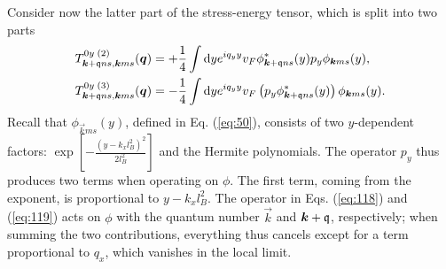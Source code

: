 Consider now the latter part of the stress-energy tensor, which is split into two parts
\begin{align}
  \label{eq:118}
  T ^{0y\; (2)} _{\bm{k}+\mathfrak{q}ns, \bm{k}ms} (\bm{q}) &= +
                                                            \frac{1}{4}
                                                            \int \mathrm{d}y
                                                            e^{iq_y y} v_F
                                                            \phi ^{*}_{\bm{k}+\mathfrak{q} ns}(y)
                                                            p_y \phi _{\bm{k}ms} (y),\\
  \label{eq:119}
  T ^{0y\; (3)} _{\bm{k}+\mathfrak{q}ns, \bm{k}ms} (\bm{q}) &= -
                                                            \frac{1}{4}
                                                            \int \mathrm{d}y
                                                            e^{iq_y y} v_F
                                                            \left( p_y\phi ^{*}_{\bm{k}+\mathfrak{q} ns}(y) \right)
                                                            \phi _{\bm{k}ms}(y).
\end{align}
Recall that $\phi_{\vec{k}ms} (y)$, defined in Eq. (\ref{eq:50}), consists of two $y$-dependent factors:
\(
  \exp \left[-\frac{(y-k_x l_B^2)^2}{2 l_{B}^2 } \right]
\)
and the Hermite polynomials.
The operator $p_y$ thus produces two terms when operating on $\phi $.
The first term, coming from the exponent, is proportional to $y-k_xl_B^2$.
The operator in Eqs. (\ref{eq:118}) and (\ref{eq:119}) acts on $\phi $ with the quantum  number $\vec{k}$ and $\bm{k} + \mathfrak{q}$, respectively;
when summing the two contributions, everything thus cancels except for a term proportional to $q_x$, which vanishes in the local limit.

